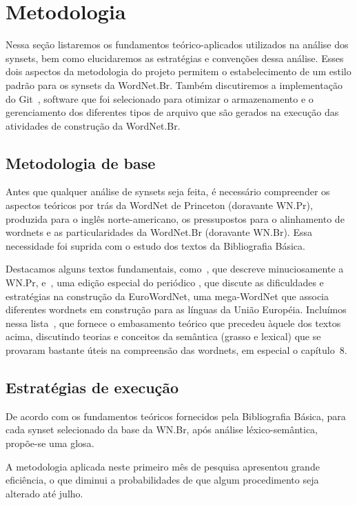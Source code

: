 \chapter{Metodologia}

Nessa seção listaremos os fundamentos teórico-aplicados utilizados na análise
dos synsets, bem como elucidaremos as estratégias e convenções dessa análise.
Esses dois aspectos da metodologia do projeto permitem o estabelecimento de um
estilo padrão para os synsets da WordNet.Br. Também discutiremos a
implementação do Git~\cite{git}, software que foi selecionado para otimizar o
armazenamento e o gerenciamento dos diferentes tipos de arquivo que são gerados
na execução das atividades de construção da WordNet.Br.

\section{Metodologia de base}

Antes que qualquer análise de synsets seja feita, é necessário compreender os
aspectos teóricos por trás da WordNet de Princeton (doravante WN.Pr), produzida
para o inglês norte-americano, os pressupostos para o alinhamento de wordnets e
as particularidades da WordNet.Br (doravante WN.Br). Essa necessidade foi
suprida com o estudo dos textos da Bibliografia Básica.

Destacamos alguns textos fundamentais, como~, que descreve
minuciosamente a WN.Pr, e~, uma edição especial do periódico
, que discute as dificuldades e
estratégias na construção da EuroWordNet, uma mega-WordNet que associa
diferentes wordnets em construção para as línguas da União Européia. Incluímos
nessa lista~, que fornece o embasamento teórico que precedeu
àquele dos textos acima, discutindo teorias e conceitos da semântica (grasso e
lexical) que se provaram bastante úteis na compreensão das wordnets, em
especial o capítulo~8.

\section{Estratégias de execução}

De acordo com os fundamentos teóricos fornecidos pela Bibliografia Básica, para
cada synset selecionado da base da WN.Br, após análise léxico-semântica,
propõe-se uma glosa.

A metodologia aplicada neste primeiro mês de pesquisa apresentou grande
eficiência, o que diminui a probabilidades de que algum procedimento seja
alterado até julho.


